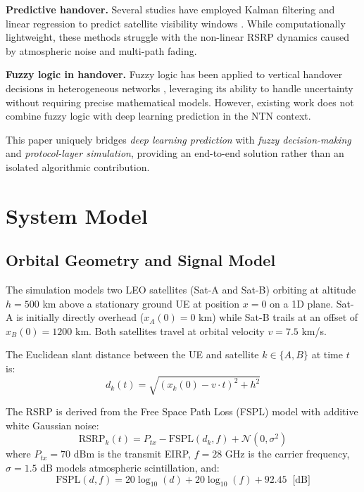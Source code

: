 \documentclass[conference]{IEEEtran}
\begin{document}
\textbf{Predictive handover.} Several studies have employed Kalman filtering and linear regression to predict satellite visibility windows \cite{b6}. While computationally lightweight, these methods struggle with the non-linear RSRP dynamics caused by atmospheric noise and multi-path fading.

\textbf{Fuzzy logic in handover.} Fuzzy logic has been applied to vertical handover decisions in heterogeneous networks \cite{b7}, leveraging its ability to handle uncertainty without requiring precise mathematical models. However, existing work does not combine fuzzy logic with deep learning prediction in the NTN context.

This paper uniquely bridges \textit{deep learning prediction} with \textit{fuzzy decision-making} and \textit{protocol-layer simulation}, providing an end-to-end solution rather than an isolated algorithmic contribution.

\section{System Model}

\subsection{Orbital Geometry and Signal Model}

The simulation models two LEO satellites (Sat-A and Sat-B) orbiting at altitude $h = 500$ km above a stationary ground UE at position $x = 0$ on a 1D plane. Sat-A is initially directly overhead ($x_A(0) = 0$ km) while Sat-B trails at an offset of $x_B(0) = 1200$ km. Both satellites travel at orbital velocity $v = 7.5$ km/s.

The Euclidean slant distance between the UE and satellite $k \in \{A, B\}$ at time $t$ is:
\begin{equation}
d_k(t) = \sqrt{(x_k(0) - v \cdot t)^2 + h^2}
\label{eq:distance}
\end{equation}

The RSRP is derived from the Free Space Path Loss (FSPL) model with additive white Gaussian noise:
\begin{equation}
\text{RSRP}_k(t) = P_{tx} - \text{FSPL}(d_k, f) + \mathcal{N}(0, \sigma^2)
\label{eq:rsrp}
\end{equation}
where $P_{tx} = 70$ dBm is the transmit EIRP, $f = 28$ GHz is the carrier frequency, $\sigma = 1.5$ dB models atmospheric scintillation, and:
\begin{equation}
\text{FSPL}(d, f) = 20\log_{10}(d) + 20\log_{10}(f) + 92.45 \;\; \text{[dB]}
\label{eq:fspl}
\end{equation}
\end{document}
